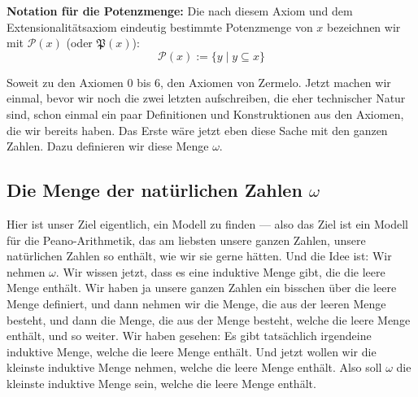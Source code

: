 \begin{math-stroke}[Potenzmengenaxiom]
\begin{axioms}
\end{axioms}

\textbf{Notation für die Potenzmenge:}
Die nach diesem Axiom und dem Extensionalitätsaxiom eindeutig bestimmte Potenzmenge von $x$ bezeichnen wir mit $\mathcal{P}(x)$ (oder $\mathfrak{P}(x)$):
\[
\mathcal{P}(x) := \{ y \mid y \subseteq x \}
\]
\end{math-stroke}

\begin{spoken-clean}[00:43:31 - 00:45:01]
Soweit zu den Axiomen 0 bis 6, den Axiomen von Zermelo. Jetzt machen wir einmal, bevor wir noch die zwei letzten aufschreiben, die eher technischer Natur sind, schon einmal ein paar Definitionen und Konstruktionen aus den Axiomen, die wir bereits haben. Das Erste wäre jetzt eben diese Sache mit den ganzen Zahlen. Dazu definieren wir diese Menge $\omega$.
\end{spoken-clean}

\subsection{Die Menge der natürlichen Zahlen \texorpdfstring{$\omega$}{omega}}
\begin{spoken-clean}[00:45:01 - 00:46:16]
Hier ist unser Ziel eigentlich, ein Modell zu finden --- also das Ziel ist ein Modell für die Peano-Arithmetik, das am liebsten unsere ganzen Zahlen, unsere natürlichen Zahlen so enthält, wie wir sie gerne hätten. Und die Idee ist: Wir nehmen $\omega$. Wir wissen jetzt, dass es eine induktive Menge gibt, die die leere Menge enthält. Wir haben ja unsere ganzen Zahlen ein bisschen über die leere Menge definiert, und dann nehmen wir die Menge, die aus der leeren Menge besteht, und dann die Menge, die aus der Menge besteht, welche die leere Menge enthält, und so weiter. Wir haben gesehen: Es gibt tatsächlich irgendeine induktive Menge, welche die leere Menge enthält. Und jetzt wollen wir die kleinste induktive Menge nehmen, welche die leere Menge enthält. Also soll $\omega$ die kleinste induktive Menge sein, welche die leere Menge enthält.
\end{spoken-clean}

